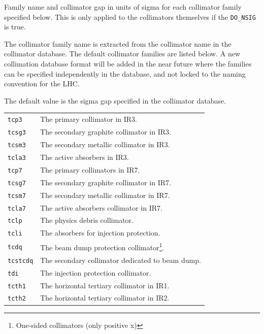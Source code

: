 Family name and collimator gap in units of sigma for each collimator family specified below.
This is only applied to the collimators themselves if the \texttt{DO\_NSIG} is true.

The collimator family name is extracted from the collimator name in the collimator database.
The default collimator families are listed below.
A new collimation database format will be added in the near future where the families can be specified independently in the database, and not locked to the naming convention for the LHC.

The default value is the sigma gap specified in the collimator database.

\bigskip
\begin{longtabu}{@{}ll}
    \texttt{tcp3}    & The primary collimator in IR3. \\
    \texttt{tcsg3}   & The secondary graphite collimator in IR3. \\
    \texttt{tcsm3}   & The secondary metallic collimator in IR3. \\
    \texttt{tcla3}   & The active absorbers in IR3. \\
    \texttt{tcp7}    & The primary collimators in IR7. \\
    \texttt{tcsg7}   & The secondary graphite collimator in IR7. \\
    \texttt{tcsm7}   & The secondary metallic collimator in IR7. \\
    \texttt{tcla7}   & The active absorbers collimator in IR7. \\
    \texttt{tclp}    & The physics debris collimator. \\
    \texttt{tcli}    & The absorbers for injection protection. \\
    \texttt{tcdq}    & The beam dump protection collimator\footnote{One-sided collimators (only positive x)}. \\
    \texttt{tcstcdq} & The secondary collimator dedicated to beam dump. \\
    \texttt{tdi}     & The injection protection collimator. \\
    \texttt{tcth1}   & The horizontal tertiary collimator in IR1. \\
    \texttt{tcth2}   & The horizontal tertiary collimator in IR2. \\

\end{longtabu}
